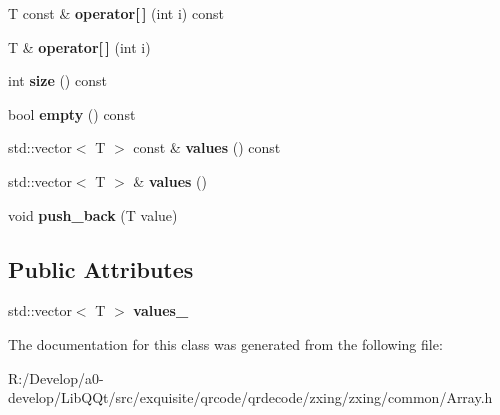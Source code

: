 \begin{DoxyCompactItemize}
\mbox{\label{classzxing_1_1_array_a0cd9f0632104d031b301e6b2f7175b87}} 
T const  \& {\bfseries operator\mbox{[}$\,$\mbox{]}} (int i) const
\item 
\mbox{\label{classzxing_1_1_array_a3c86f03b981f5db3d74216e6d497dba7}} 
T \& {\bfseries operator\mbox{[}$\,$\mbox{]}} (int i)
\item 
\mbox{\label{classzxing_1_1_array_ac0df79ac1a0e54d3defa97c84938642d}} 
int {\bfseries size} () const
\item 
\mbox{\label{classzxing_1_1_array_a8538513b2c4ebdb20527454418150e91}} 
bool {\bfseries empty} () const
\item 
\mbox{\label{classzxing_1_1_array_aa50711d9dd86ff5e0da77df05abfb5aa}} 
std\+::vector$<$ T $>$ const  \& {\bfseries values} () const
\item 
\mbox{\label{classzxing_1_1_array_a4f266331632fb1935f40a586ec211621}} 
std\+::vector$<$ T $>$ \& {\bfseries values} ()
\item 
\mbox{\label{classzxing_1_1_array_a0f9d612513ba5cb5e75b10f228f27032}} 
void {\bfseries push\+\_\+back} (T value)
\end{DoxyCompactItemize}
\subsection*{Public Attributes}
\begin{DoxyCompactItemize}
\item 
\mbox{\label{classzxing_1_1_array_a314993e45cef504f4dacd99662afa14d}} 
std\+::vector$<$ T $>$ {\bfseries values\+\_\+}
\end{DoxyCompactItemize}


The documentation for this class was generated from the following file\+:\begin{DoxyCompactItemize}
\item 
R\+:/\+Develop/a0-\/develop/\+Lib\+Q\+Qt/src/exquisite/qrcode/qrdecode/zxing/zxing/common/Array.\+h\end{DoxyCompactItemize}
